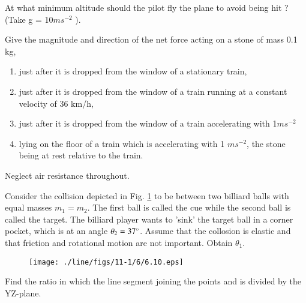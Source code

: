 At what minimum  altitude should the pilot fly the plane to avoid being hit ? (Take g = 10$ m s^{-2}$
).
\item Give the magnitude and direction of the net force acting on a stone of mass 0.1 kg, 
\begin{enumerate}
\item  just after it is dropped from the window of a stationary train, 
\item  just after it is dropped from the window of a train running at a constant velocity of 36 km/h,
\item  just after it is dropped from the window of a train accelerating with 1$ m s^{-2} $
\item  lying on the floor of a train which is accelerating with 1 $m s^{-2}$, the stone being at rest relative to the train.
\end{enumerate}
Neglect air resistance throughout. 

\item Consider the collision depicted in Fig. \ref{fig:6.10} to be between two billiard balls with equal masses $m_1= m_2$.  The first ball is called the cue while the second ball is called the target. The billiard player wants to 'sink' the target ball in a corner pocket, which is at an angle $\theta_2=37\degree$.  Assume that the collosion
is elastic and that friction and rotational motion are not important. Obtain $\theta_1$.
\begin{figure}[!ht]
\centering
\texttt{[image: ./line/figs/11-1/6/6.10.eps]}
\caption{}
\label{fig:6.10}
\end{figure}
%
\item Find the ratio in which the line segment joining the points  and  is divided by the YZ-plane.
%
%

